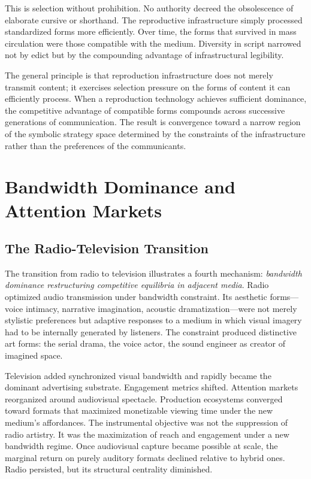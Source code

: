 \documentclass[12pt, oneside]{book}
\theoremstyle{plain}
\theoremstyle{definition}
\theoremstyle{remark}
\theoremstyle{definition}
\begin{document}
This is selection without prohibition. No authority decreed the obsolescence of
elaborate cursive or shorthand. The reproductive infrastructure simply processed
standardized forms more efficiently. Over time, the forms that survived in mass
circulation were those compatible with the medium. Diversity in script narrowed not
by edict but by the compounding advantage of infrastructural legibility.

The general principle is that reproduction infrastructure does not merely transmit
content; it exercises selection pressure on the forms of content it can efficiently
process. When a reproduction technology achieves sufficient dominance, the competitive
advantage of compatible forms compounds across successive generations of communication.
The result is convergence toward a narrow region of the symbolic strategy space
determined by the constraints of the infrastructure rather than the preferences of
the communicants.

\chapter{Bandwidth Dominance and Attention Markets}
\label{ch:bandwidth}

\section{The Radio-Television Transition}

The transition from radio to television illustrates a fourth mechanism: \emph{bandwidth
dominance restructuring competitive equilibria in adjacent media}. Radio optimized
audio transmission under bandwidth constraint. Its aesthetic forms---voice intimacy,
narrative imagination, acoustic dramatization---were not merely stylistic preferences
but adaptive responses to a medium in which visual imagery had to be internally
generated by listeners. The constraint produced distinctive art forms: the serial
drama, the voice actor, the sound engineer as creator of imagined space.

Television added synchronized visual bandwidth and rapidly became the dominant
advertising substrate. Engagement metrics shifted. Attention markets reorganized
around audiovisual spectacle. Production ecosystems converged toward formats that
maximized monetizable viewing time under the new medium's affordances. The instrumental
objective was not the suppression of radio artistry. It was the maximization of reach
and engagement under a new bandwidth regime. Once audiovisual capture became possible
at scale, the marginal return on purely auditory formats declined relative to hybrid
ones. Radio persisted, but its structural centrality diminished.
\end{document}
